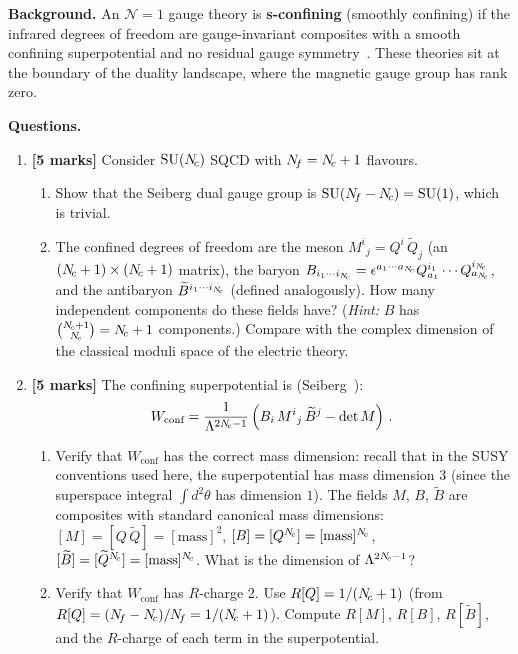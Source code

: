 \documentclass[11pt,a4paper]{article}
\begin{document}
\noindent\textbf{Background.}
An $\mathcal{N}=1$ gauge theory is \textbf{s-confining} (smoothly
confining) if the infrared degrees of freedom are gauge-invariant
composites with a smooth confining superpotential and no residual gauge
symmetry~\cite{CSS9612207}.  These theories sit at the boundary of the
duality landscape, where the magnetic gauge group has rank zero.

\medskip

\noindent\textbf{Questions.}
\begin{enumerate}[label=(\alph*)]

  \item \textbf{[5 marks]}
    Consider $\mathrm{SU}(N_{\!c})$ SQCD with $N_{\!f} = N_{\!c} + 1$ flavours.
    \begin{enumerate}[label=(\roman*)]
      \item Show that the Seiberg dual gauge group is
        $\mathrm{SU}(N_{\!f} - N_{\!c}) = \mathrm{SU}(1)$, which is trivial.
      \item The confined degrees of freedom are the meson
        $M^i{}_j = Q^i\,\widetilde{Q}_j$ (an $(N_{\!c}+1) \times (N_{\!c}+1)$
        matrix), the baryon $B_{i_1 \cdots i_{N_{\!c}}}
        = \epsilon^{a_1 \cdots a_{N_{\!c}}} Q^{i_1}_{a_1} \cdots
        Q^{i_{N_{\!c}}}_{a_{N_{\!c}}}$, and the antibaryon
        $\widetilde{B}^{i_1 \cdots i_{N_{\!c}}}$ (defined analogously).
        How many independent components do these fields have?
        (\textit{Hint:} $B$ has $\binom{N_{\!c}+1}{N_{\!c}} = N_{\!c} + 1$
        components.)  Compare with the complex dimension of the
        classical moduli space of the electric theory.
    \end{enumerate}

  \item \textbf{[5 marks]}
    The confining superpotential is
    (Seiberg~\cite{Seiberg1995}):
    \begin{equation}\label{eq:s-confine-W}
      W_{\text{conf}} = \frac{1}{\Lambda^{2N_{\!c} - 1}}
      \left(B_i\, M^i{}_j\, \widetilde{B}^j - \det M\right)\,.
    \end{equation}
    \begin{enumerate}[label=(\roman*)]
      \item Verify that $W_{\text{conf}}$ has the correct mass
        dimension: recall that in the SUSY conventions used here,
        the superpotential has mass dimension $3$ (since the
        superspace integral $\int d^2\theta$ has dimension $1$).
        The fields $M$, $B$, $\widetilde{B}$ are composites with
        standard canonical mass dimensions: $[M] = [Q\,\widetilde{Q}]
        = [\text{mass}]^2$, $[B] = [Q^{N_{\!c}}] = [\text{mass}]^{N_{\!c}}$,
        $[\widetilde{B}] = [\widetilde{Q}^{N_{\!c}}]
        = [\text{mass}]^{N_{\!c}}$.  What is the
        dimension of $\Lambda^{2N_{\!c} - 1}$?
      \item Verify that $W_{\text{conf}}$ has $R$-charge $2$.
        Use $R[Q] = 1/(N_{\!c} + 1)$ (from
        $R[Q] = (N_{\!f} - N_{\!c})/N_{\!f} = 1/(N_{\!c}+1)$).  Compute
        $R[M]$, $R[B]$, $R[\widetilde{B}]$, and the
        $R$-charge of each term in the superpotential.
    \end{enumerate}


\end{enumerate}
\end{document}
